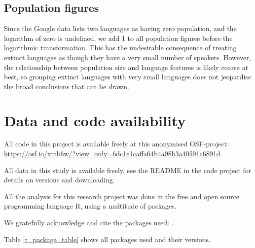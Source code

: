 \documentclass[USenglish]{article}
\begin{document}

\subsection{Population figures}
Since the Google data lists two languages as having zero population, and the logarithm of zero is undefined, we add 1 to all population figures before the logarithmic transformation.
This has the undesirable consequence of treating extinct languages as though they have a very small number of speakers.
However, the relationship between population size and language features is likely coarse at best, so grouping extinct languages with very small languages does not jeopardise the broad conclusions that can be drawn.

\section{Data and code availability}
All code in this project is available freely at this anonymised OSF-project: \url{https://osf.io/xmb6w/?view_only=6dc1e1caffa64b4a98b3a40591c6891d}.

All data in this study is available freely, see the README in the code project for details on versions and downloading.

All the analysis for this research project was done in the free and open source programming language R, using a multitude of packages. 

We gratefully acknowledge and cite the packages used: .

Table \ref{r_package_table} shows all packages used and their versions.




\end{document}
